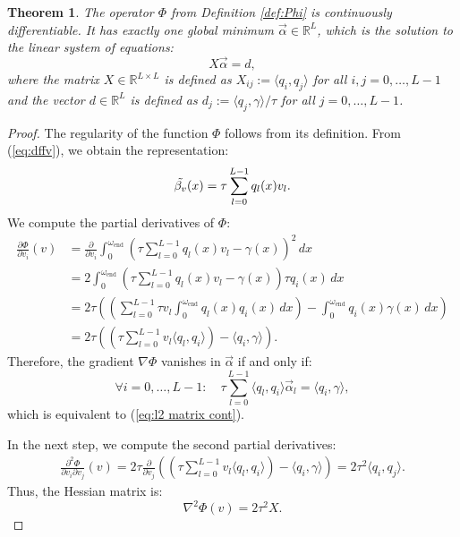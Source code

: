 \documentclass[a4paper,11pt,bibliography=totoc,listof=totoc,headinclude=true,cleardoublepage=empty,oneside]{scrbook}
\newtheorem{theorem}{Theorem}[chapter]
\newcommand{\R}{\mathbb{R}}
\newcommand{\e}{\mathrm{end}}
\renewcommand{\eqref}[1]{(\ref{#1})}
\begin{document}
\begin{theorem}
    The operator $\Phi$ from Definition \ref{def:Phi} is continuously differentiable. It has exactly one global minimum $\Vec{\alpha} \in \R^L$, which is the solution to the linear system of equations:
    \begin{equation}\label{eq:l2 matrix cont}
        X \Vec{\alpha} = d,
    \end{equation}
    where the matrix $X\in \R^{L\times L}$ is defined as $X_{ij} := \langle q_i, q_j \rangle$ for all $i, j = 0, \dots, L-1$ and the vector $d \in \R^L$ is defined as $d_j := \langle q_j, \gamma\rangle/\tau$ for all $j = 0, \dots, L-1$.
\end{theorem}
\begin{proof}
    The regularity of the function $\Phi$ follows from its definition. From \eqref{eq:dffv}, we obtain the representation: 
    \begin{equation*}
        \Tilde{\beta_v} (x) = \tau \sum_{l=0}^{L-1} q_l(x) v_l.
    \end{equation*}
    We compute the partial derivatives of $\Phi$:
    \begin{align*}
        \frac{\partial \Phi}{\partial v_i}(v) &= \frac{\partial}{\partial v_i} \int_0^{\omega_\e} \left(\tau \sum_{l=0}^{L-1} q_l(x) v_l - \gamma(x) \right)^2 \, dx \\ &= 2 \int_0^{\omega_\e} \left(\tau \sum_{l=0}^{L-1} q_l(x) v_l - \gamma(x) \right)\tau q_i(x) \, dx \\ &= 2 \tau \left(\left(\sum_{l=0}^{L-1} \tau v_l \int_0^{\omega_\e} q_l(x) q_i(x) \, dx \right) - \int_0^{\omega_\e} q_i(x)\gamma(x) \, dx \right) \\ &= 2\tau \left( \left( \tau\sum_{l=0}^{L-1} v_l \langle q_l, q_i\rangle \right) - \langle q_i, \gamma\rangle \right).
    \end{align*}
    Therefore, the gradient $\nabla\Phi$ vanishes in $\Vec{\alpha}$ if and only if:
    \begin{equation*}
        \forall i = 0, \dots, L-1: \quad  \tau\sum_{l=0}^{L-1} \langle q_l, q_i\rangle \Vec{\alpha}_l = \langle q_i, \gamma \rangle,
    \end{equation*}
    which is equivalent to \eqref{eq:l2 matrix cont}.
    
 In the next step, we compute the second partial derivatives:
    \begin{align*}
        \frac{\partial^2 \Phi}{\partial v_i \partial v_j}(v) = 2\tau \frac{\partial}{\partial v_j }  \left( \left( \tau\sum_{l=0}^{L-1} v_l \langle q_l, q_i\rangle \right) - \langle q_i, \gamma\rangle \right) = 2\tau^2 \langle q_i, q_j \rangle.
    \end{align*}
    Thus, the Hessian matrix is:
    \begin{equation*}
        \nabla^2 \Phi(v) = 2 \tau^2 X.
    \end{equation*}
    

\end{proof}
\end{document}
